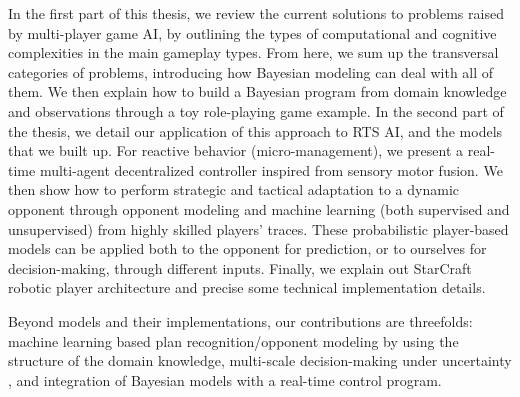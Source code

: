 \documentclass[a4paper,12pt]{article}
\begin{document}
In the first part of this thesis, we review the current solutions to problems raised by multi-player game AI, by outlining the types of computational and cognitive complexities in the main gameplay types. From here, we sum up the transversal categories of problems, introducing how Bayesian modeling can deal with all of them. We then explain how to build a Bayesian program from domain knowledge and observations through a toy role-playing game example. In the second part of the thesis, we detail our application of this approach to RTS AI, and the models that we built up. For reactive behavior (micro-management), we present a real-time multi-agent decentralized controller inspired from sensory motor fusion. We then show how to perform strategic and tactical adaptation to a dynamic opponent through opponent modeling and machine learning (both supervised and unsupervised) from highly skilled players' traces. These probabilistic player-based models can be applied both to the opponent for prediction, or to ourselves for decision-making, through different inputs. Finally, we explain out StarCraft robotic player architecture and precise some technical implementation details.

Beyond models and their implementations, our contributions are threefolds: machine learning based plan recognition/opponent modeling %
by using the structure of the domain knowledge, multi-scale decision-making under uncertainty%
, and integration of Bayesian models with a real-time control program.
\end{document}
